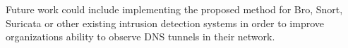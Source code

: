 \documentclass[12pt]{report}
\theoremstyle{remark}
\theoremstyle{definition}
\theoremstyle{definition}
\theoremstyle{definition}
\begin{document}
Future work could include implementing the proposed method for Bro, Snort, Suricata or other existing intrusion detection systems in order to improve organizations ability to observe DNS tunnels in their network.

%
%
\end{document}
